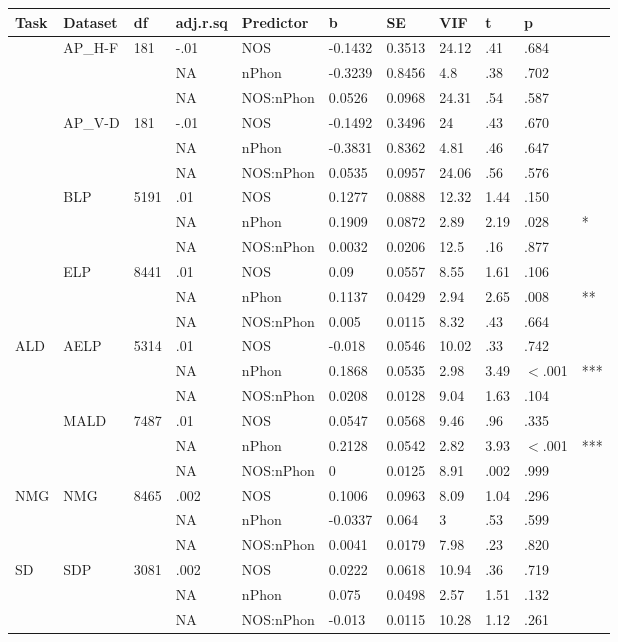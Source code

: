 \begin{table}[ht]
\centering
\begingroup\normalsize
\begin{tabular}{lllllllllll}
  \hline
Task & Dataset & df & adj.r.sq & Predictor & b & SE & VIF & t & p &  \\ 
  \hline
 & AP\_H-F & 181 & -.01 & NOS & -0.1432 & 0.3513 & 24.12 & .41 & .684 &   \\ 
   &  &  & NA & nPhon & -0.3239 & 0.8456 & 4.8 & .38 & .702 &   \\ 
   &  &  & NA & NOS:nPhon & 0.0526 & 0.0968 & 24.31 & .54 & .587 &   \\ 
   & AP\_V-D & 181 & -.01 & NOS & -0.1492 & 0.3496 & 24 & .43 & .670 &   \\ 
   &  &  & NA & nPhon & -0.3831 & 0.8362 & 4.81 & .46 & .647 &   \\ 
   &  &  & NA & NOS:nPhon & 0.0535 & 0.0957 & 24.06 & .56 & .576 &   \\ 
   & BLP & 5191 & .01 & NOS & 0.1277 & 0.0888 & 12.32 & 1.44 & .150 &   \\ 
   &  &  & NA & nPhon & 0.1909 & 0.0872 & 2.89 & 2.19 & .028 & * \\ 
   &  &  & NA & NOS:nPhon & 0.0032 & 0.0206 & 12.5 & .16 & .877 &   \\ 
   & ELP & 8441 & .01 & NOS & 0.09 & 0.0557 & 8.55 & 1.61 & .106 &   \\ 
   &  &  & NA & nPhon & 0.1137 & 0.0429 & 2.94 & 2.65 & .008 & ** \\ 
   &  &  & NA & NOS:nPhon & 0.005 & 0.0115 & 8.32 & .43 & .664 &   \\ 
  ALD & AELP & 5314 & .01 & NOS & -0.018 & 0.0546 & 10.02 & .33 & .742 &   \\ 
   &  &  & NA & nPhon & 0.1868 & 0.0535 & 2.98 & 3.49 & $<$.001 & *** \\ 
   &  &  & NA & NOS:nPhon & 0.0208 & 0.0128 & 9.04 & 1.63 & .104 &   \\ 
   & MALD & 7487 & .01 & NOS & 0.0547 & 0.0568 & 9.46 & .96 & .335 &   \\ 
   &  &  & NA & nPhon & 0.2128 & 0.0542 & 2.82 & 3.93 & $<$.001 & *** \\ 
   &  &  & NA & NOS:nPhon & 0 & 0.0125 & 8.91 & .002 & .999 &   \\ 
  NMG & NMG & 8465 & .002 & NOS & 0.1006 & 0.0963 & 8.09 & 1.04 & .296 &   \\ 
   &  &  & NA & nPhon & -0.0337 & 0.064 & 3 & .53 & .599 &   \\ 
   &  &  & NA & NOS:nPhon & 0.0041 & 0.0179 & 7.98 & .23 & .820 &   \\ 
  SD & SDP & 3081 & .002 & NOS & 0.0222 & 0.0618 & 10.94 & .36 & .719 &   \\ 
   &  &  & NA & nPhon & 0.075 & 0.0498 & 2.57 & 1.51 & .132 &   \\ 
   &  &  & NA & NOS:nPhon & -0.013 & 0.0115 & 10.28 & 1.12 & .261 &   \\ 
   \hline
\end{tabular}
\endgroup
\end{table}
